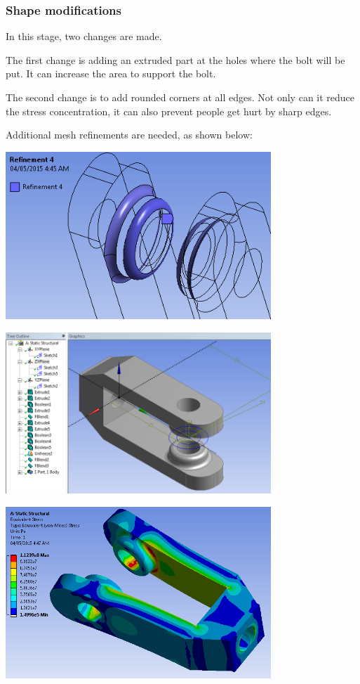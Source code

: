 \documentclass[a4paper,14pt]{extarticle}
\begin{document}
\subsubsection{Shape modifications}
In this stage, two changes are made.

The first change is adding an extruded part at the holes where the bolt will be put. It can increase the area to support the bolt.

The second change is to add rounded corners at all edges. Not only can it reduce the stress concentration, it can also prevent people get hurt by sharp edges.

Additional mesh refinements are needed, as shown below:

\begin{center}\includegraphics[width=0.75\textwidth]{NX/REF2.PNG}\end{center}

\begin{center}\includegraphics[width=0.75\textwidth]{NX/GEOMETRY.PNG}\end{center}

\begin{center}\includegraphics[width=0.75\textwidth]{NX/STRESS.PNG}\end{center}
\end{document}
